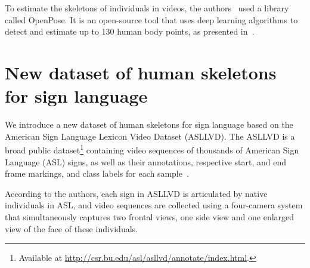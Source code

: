 To estimate the skeletons of individuals in videos, the authors~\cite{st-gcn-2018} used a library called OpenPose. It is an open-source tool that uses deep learning algorithms to detect and estimate up to 130 human body points, as presented in~\cite{cao-realtime-2017,simon-hand-2017,wei-cpm-2016}.



\section{New dataset of human skeletons for sign language} 
\label{sec:new-dataset}

We introduce a new dataset of human skeletons for sign language based on the American Sign Language Lexicon Video Dataset (ASLLVD). The ASLLVD  is a broad public dataset\footnote{ Available at \url{http://csr.bu.edu/asl/asllvd/annotate/index.html}.} containing video sequences of thousands of American Sign Language (ASL) signs, as well as their annotations, respective start, and end frame markings, and class labels for each sample~\cite{athitsos-asllvd-2008,neidle-2012,vloger-2012}.

According to the authors, each sign in ASLLVD is articulated by native individuals in ASL, and video sequences are collected using a four-camera system that simultaneously captures two frontal views, one side view and one enlarged view of the face of these individuals. %

    

